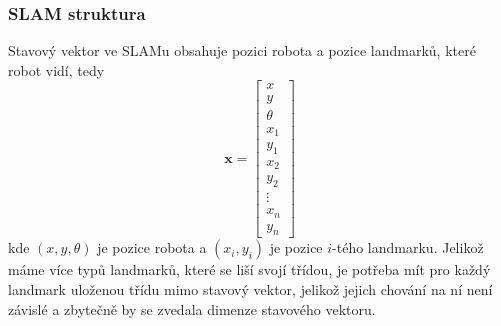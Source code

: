 \documentclass[a4paper,12pt]{article}
\begin{document}
\subsubsection{SLAM struktura}
Stavový vektor ve SLAMu obsahuje pozici robota a pozice landmarků, které robot vidí, tedy 
\begin{equation}
    \mathbf x = \begin{bmatrix}
        x \\
        y \\
        \theta \\
        x_1 \\
        y_1 \\
        x_2 \\
        y_2 \\
        \vdots \\
        x_n \\
        y_n 
    \end{bmatrix}
\end{equation}
kde $(x,y, \theta)$ je pozice robota a $(x_i,y_i)$ je pozice $i$-tého landmarku.
Jelikož máme více typů landmarků, které se liší svojí třídou, je potřeba mít pro každý landmark uloženou třídu mimo stavový vektor, 
jelikož jejich chování na ní není závislé a zbytečně by se zvedala dimenze stavového vektoru.
\end{document}
